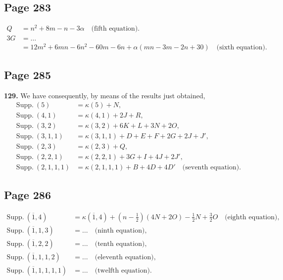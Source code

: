 \documentclass[11pt,a4paper]{article}
\theoremstyle{definition}
\begin{document}
\subsection*{Page 283}

\begin{align*}
Q &= n^2 + 8m - n - 3\alpha \quad \text{(fifth equation)}.\\
3G &= \ldots\\
&= 12m^2 + 6mn - 6n^2 - 60m - 6n + \alpha(mn - 3m - 2n + 30) \quad \text{(sixth equation)}.
\end{align*}

\subsection*{Page 285}

\noindent\textbf{129.} We have consequently, by means of the results just obtained,
\begin{align*}
\text{Supp.}\ (5) &= \kappa(5) + N,\\
\text{Supp.}\ (4,1) &= \kappa(4,1) + 2J + R,\\
\text{Supp.}\ (3,2) &= \kappa(3,2) + 6K + L + 3N + 2O,\\
\text{Supp.}\ (3,1,1) &= \kappa(3,1,1) + D + E + F + 2G + 2J + J',\\
\text{Supp.}\ (2,3) &= \kappa(2,3) + Q,\\
\text{Supp.}\ (2,2,1) &= \kappa(2,2,1) + 3G + I + 4J + 2J',\\
\text{Supp.}\ (2,1,1,1) &= \kappa(2,1,1,1) + B + 4D + 4D' \quad \text{(seventh equation)}.
\end{align*}

\subsection*{Page 286}

\begin{align*}
\text{Supp.}\ (\overline{1},4) &= \kappa(\overline{1},4) + (n - \tfrac{1}{2})(4N + 2O) - \tfrac{1}{2}N + \tfrac{3}{2}O \quad \text{(eighth equation)},\\
\text{Supp.}\ (\overline{1},1,3) &= \ldots \quad \text{(ninth equation)},\\
\text{Supp.}\ (\overline{1},2,2) &= \ldots \quad \text{(tenth equation)},\\
\text{Supp.}\ (\overline{1},1,1,2) &= \ldots \quad \text{(eleventh equation)},\\
\text{Supp.}\ (\overline{1},1,1,1,1) &= \ldots \quad \text{(twelfth equation)}.
\end{align*}
\end{document}
